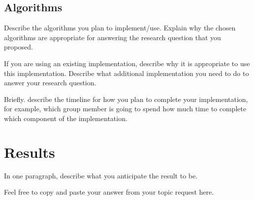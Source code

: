 \documentclass[letterpaper]{article} %
\begin{document}
\subsection{Algorithms}

Describe the algorithms you plan to implement/use.  Explain why the chosen algorithms are appropriate for answering the research question that you proposed.  

If you are using an existing implementation, describe why it is appropriate to use this implementation.  Describe what additional implementation you need to do to answer your research question.

Briefly. describe the timeline for how you plan to complete your implementation, for example, which group member is going to spend how much time to complete which component of the implementation.


\section{Results}

In one paragraph, describe what you anticipate the result to be. 

Feel free to copy and paste your answer from your topic request here.

\newpage


\end{document}
